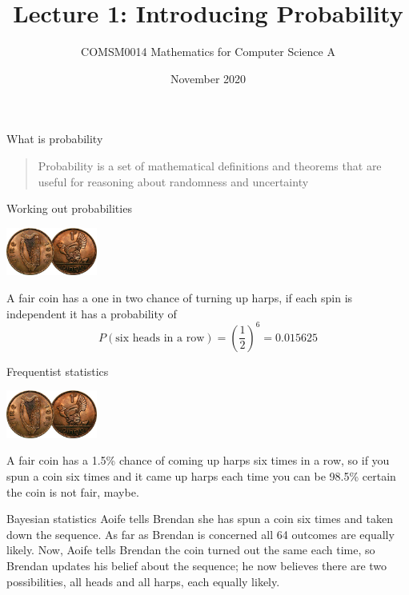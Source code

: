 \documentclass{beamer}
\title{Lecture 1: Introducing Probability}
\author{COMSM0014 Mathematics for Computer Science A}
\institute{\texttt{cs-uob.github.io/COMS10014/ and github.com/coms10011/2020\_21}}
\date{November 2020}
\newcommand{\crish}{\color{reddish}}
\newcommand{\cbla}{\color{black}}
\newcommand{\cred}{\color{red}}
\newcommand{\cblu}{\color{blue}}
\begin{document}
\maketitle
\begin{frame}{What is probability}
  \begin{quote}
    Probability is a set of mathematical definitions and theorems that
    are useful for reasoning about randomness and uncertainty
  \end{quote}
\end{frame}

\begin{frame}{Working out probabilities}
  \begin{center}
    \includegraphics[width=3cm]{1d.jpg}
    \end{center}
  A fair coin has a one in two chance of turning up harps, if each spin is independent it has a probability of
  \crish$$P(\mbox{six heads in a row})=\left(\frac{1}{2}\right)^6=0.015625$$\cbla{}
\end{frame}

\begin{frame}{Frequentist statistics}
    \begin{center}
    \includegraphics[width=3cm]{1d.jpg}
    \end{center}
A fair coin has a 1.5\% chance of coming up harps six times in a row,
so if you spun a coin six times and it came up harps each time you can
be 98.5\% certain the coin is not fair, maybe.
\end{frame}

\begin{frame}{Bayesian statistics}
  \cred{}Aoife\cbla{}  tells \cblu{}Brendan\cbla{}  she has spun a coin six times and taken down the
  sequence. As far as \cblu{}Brendan\cbla{}  is concerned all 64 outcomes are equally
  likely. Now, \cred{}Aoife\cbla{}  tells \cblu{}Brendan\cbla{}  the coin turned out the same each
  time, so \cblu{}Brendan\cbla{}  updates his belief about the sequence; he now
  believes there are two possibilities, all heads and all harps, each
  equally likely.
\end{frame}
\end{document}
